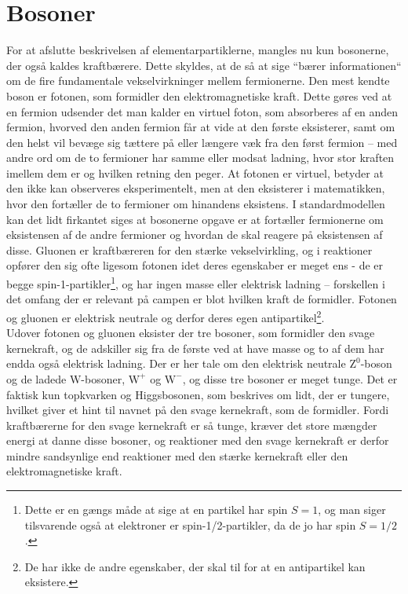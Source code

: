 \section{Bosoner}
For at afslutte beskrivelsen af elementarpartiklerne, mangles nu kun bosonerne, der også kaldes kraftbærere. Dette skyldes, at de så at sige ``bærer informationen`` om de fire fundamentale vekselvirkninger mellem fermionerne. Den mest kendte boson er fotonen, som formidler den elektromagnetiske kraft. Dette gøres ved at en fermion udsender det man kalder en virtuel foton, som absorberes af en anden fermion, hvorved den anden fermion får at vide at den første eksisterer, samt om den helst vil bevæge sig tættere på eller længere væk fra den først fermion -- med andre ord om de to fermioner har samme eller modsat ladning, hvor stor kraften imellem dem er og hvilken retning den peger. At fotonen er virtuel, betyder at den ikke kan observeres eksperimentelt, men at den eksisterer i matematikken, hvor den fortæller de to fermioner om hinandens eksistens. I standardmodellen kan det lidt firkantet siges at bosonerne opgave er at fortæller fermionerne om eksistensen af de andre fermioner og hvordan de skal reagere på eksistensen af disse. Gluonen er kraftbæreren for den stærke vekselvirkling, og i reaktioner opfører den sig ofte ligesom fotonen idet deres egenskaber er meget ens - de er begge spin-1-partikler\footnote{Dette er en gængs måde at sige at en partikel har spin $S=1$, og man siger tilsvarende også at elektroner er spin-1/2-partikler, da de jo har spin $S=1/2$.}, og har ingen masse eller elektrisk ladning -- forskellen i det omfang der er relevant på campen er blot hvilken kraft de formidler. Fotonen og gluonen er elektrisk neutrale og derfor deres egen antipartikel\footnote{De har ikke de andre egenskaber, der skal til for at en antipartikel kan eksistere.}. \\

Udover fotonen og gluonen eksister der tre bosoner, som formidler den svage kernekraft, og de adskiller sig fra de første ved at have masse og to af dem har endda også elektrisk ladning. Der er her tale om den elektrisk neutrale $\mathrm{Z}^0$-boson og de ladede $\mathrm{W}$-bosoner, $\mathrm{W}^+$ og $\mathrm{W}^-$, og disse tre bosoner er meget tunge. Det er faktisk kun topkvarken og Higgsbosonen, som beskrives om lidt, der er tungere, hvilket giver et hint til navnet på den svage kernekraft, som de formidler. Fordi kraftbærerne for den svage kernekraft er så tunge, kræver det store mængder energi at danne disse bosoner, og reaktioner med den svage kernekraft er derfor mindre sandsynlige end reaktioner med den stærke kernekraft eller den elektromagnetiske kraft. \\

